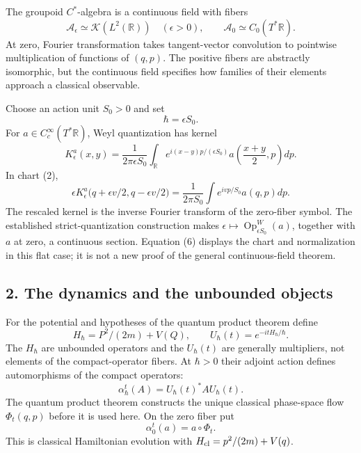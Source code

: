 \documentclass[11pt,a4paper]{article}
\begin{document}
The groupoid \(C^*\)-algebra is a continuous field with fibers \[
 \mathcal A_\epsilon\simeq\mathcal K(L^2(\mathbb R))
 \quad(\epsilon>0),\qquad
 \mathcal A_0\simeq C_0(T^*\mathbb R).
 \tag{3}
\] At zero, Fourier transformation takes tangent-vector convolution to
pointwise multiplication of functions of \((q,p)\). The positive fibers
are abstractly isomorphic, but the continuous field specifies how
families of their elements approach a classical observable.

Choose an action unit \(S_0>0\) and set \[\hbar=\epsilon S_0.\tag{4}\]
For \(a\in C_c^\infty(T^*\mathbb R)\), Weyl quantization has kernel \[
 K_\epsilon^a(x,y)=\frac1{2\pi\epsilon S_0}
 \int_{\mathbb R}e^{i(x-y)p/(\epsilon S_0)}
       a\!\left(\frac{x+y}{2},p\right)dp.\tag{5}
\] In chart (2), \[
 \epsilon K_\epsilon^a
  \big(q+\epsilon v/2,q-\epsilon v/2\big)
 =\frac1{2\pi S_0}\int e^{ivp/S_0}a(q,p)dp.\tag{6}
\] The rescaled kernel is the inverse Fourier transform of the
zero-fiber symbol. The established strict-quantization construction
makes \(\epsilon\mapsto\operatorname{Op}_{\epsilon S_0}^W(a)\), together
with \(a\) at zero, a continuous section. Equation (6) displays the
chart and normalization in this flat case; it is not a new proof of the
general continuous-field theorem.

\subsection{2. The dynamics and the unbounded
objects}\label{the-dynamics-and-the-unbounded-objects}

For the potential and hypotheses of the quantum product theorem define
\[
 H_\hbar=P^2/(2m)+V(Q),\qquad U_\hbar(t)=e^{-itH_\hbar/\hbar}.\tag{7}
\] The \(H_\hbar\) are unbounded operators and the \(U_\hbar(t)\) are
generally multipliers, not elements of the compact-operator fibers. At
\(\hbar>0\) their adjoint action defines automorphisms of the compact
operators: \[\alpha_\hbar^t(A)=U_\hbar(t)^*AU_\hbar(t).\tag{8}\] The
quantum product theorem constructs the unique classical phase-space flow
\(\Phi_t(q,p)\) before it is used here. On the zero fiber put
\[\alpha_0^t(a)=a\circ\Phi_t.\tag{9}\] This is classical Hamiltonian
evolution with \(H_{\rm cl}=p^2/(2m)+V(q)\).
\end{document}
